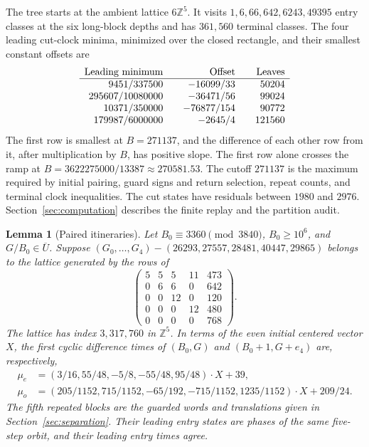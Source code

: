 \documentclass[11pt,reqno]{amsart}
\newtheorem{lemma}[theorem]{Lemma}
\theoremstyle{remark}
\newcommand{\Z}{\mathbb Z}
\begin{document}
The tree starts at the ambient lattice \(6\Z^5\). It visits \(1,6,66,642,6243,49395\) entry classes at the six long-block depths and has \(361{,}560\) terminal classes. The four leading cut-clock minima, minimized over the closed rectangle, and their smallest constant offsets are
\[
\begin{array}{r@{\qquad}r@{\qquad}r}
 \text{Leading minimum}&\text{Offset}&\text{Leaves}\\
 \hline
 9451/337500 & -16099/33 & 50204\\
 295607/10080000 & -36471/56 & 99024\\
 10371/350000 & -76877/154 & 90772\\
 179987/6000000 & -2645/4 & 121560
\end{array}
\]
The first row is smallest at \(B=271137\), and the difference of each other row from it, after multiplication by \(B\), has positive slope. The first row alone crosses the ramp at \(B=3622275000/13387\approx270581.53\). The cutoff \(271137\) is the maximum required by initial pairing, guard signs and return selection, repeat counts, and terminal clock inequalities. The cut states have residuals between \(1980\) and \(2976\). Section~\ref{sec:computation} describes the finite replay and the partition audit.

\begin{lemma}[Paired itineraries]\label{lem:cohort}
Let \(B_0\equiv3360\pmod{3840}\), \(B_0\ge10^6\), and \(G/B_0\in\overline U\). Suppose \((G_0,\ldots,G_4)-(26293,27557,28481,40447,29865)\) belongs to the lattice generated by the rows of
\[
 \begin{pmatrix}
 5&5&5&11&473\\
 0&6&6&0&642\\
 0&0&12&0&120\\
 0&0&0&12&480\\
 0&0&0&0&768
 \end{pmatrix}.
\]
The lattice has index \(3{,}317{,}760\) in \(\Z^5\). In terms of the even initial centered vector \(X\), the first cyclic difference times of \((B_0,G)\) and \((B_0+1,G+e_4)\) are, respectively,
\[
 \begin{aligned}
 \mu_e&=(3/16,55/48,-5/8,-55/48,95/48)\cdot X+39,\\
 \mu_o&=(205/1152,715/1152,-65/192,-715/1152,1235/1152)\cdot X+209/24 .
 \end{aligned}
\]
The fifth repeated blocks are the guarded words and translations given in Section~\ref{sec:separation}. Their leading entry states are phases of the same five-step orbit, and their leading entry times agree.
\end{lemma}
\end{document}
